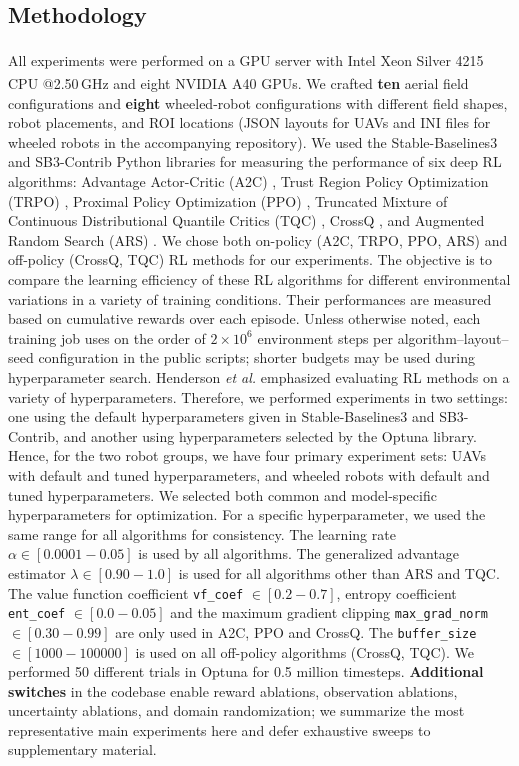 \documentclass{article}
\begin{document}
\subsection{Methodology}
All experiments were performed on a GPU server with  Intel\textsuperscript{\textregistered} Xeon\textsuperscript{\textregistered} Silver 4215 CPU @2.50\,GHz and eight NVIDIA\textsuperscript{\textregistered} A40 GPUs. We crafted \textbf{ten} aerial field configurations and \textbf{eight} wheeled-robot configurations with different field shapes, robot placements, and ROI locations (JSON layouts for UAVs and INI files for wheeled robots in the accompanying repository). We used the Stable-Baselines3 and SB3-Contrib \citep{stable-baselines3} Python libraries for measuring the performance of six deep RL algorithms: Advantage Actor-Critic (A2C) \citep{mnih2016a2c}, Trust Region Policy Optimization (TRPO) \citep{schulman2015trust}, Proximal Policy Optimization (PPO) \citep{schulman2017ppo}, Truncated Mixture of Continuous Distributional Quantile Critics (TQC) \citep{kuznetsov2020tqc}, CrossQ \citep{bhatt2024crossq}, and Augmented Random Search (ARS) \citep{mania2018ars}. We chose both on-policy (A2C, TRPO, PPO, ARS) and off-policy (CrossQ, TQC) RL methods for our experiments. The objective is to compare the learning efficiency of these RL algorithms for different environmental variations in a variety of training conditions. Their performances are measured based on cumulative rewards over each episode.
Unless otherwise noted, each training job uses on the order of $2 \times 10^6$ environment steps per algorithm--layout--seed configuration in the public scripts; shorter budgets may be used during hyperparameter search. Henderson \textit{et al.}\citep{henderson2018deep} emphasized evaluating RL methods on a variety of hyperparameters. Therefore, we performed experiments in two settings: one using the default hyperparameters given in Stable-Baselines3 and SB3-Contrib, and another using hyperparameters selected by the Optuna \citep{optuna_2019} library. Hence, for the two robot groups, we have four primary experiment sets: UAVs with default and tuned hyperparameters, and wheeled robots with default and tuned hyperparameters. We selected both common and model-specific hyperparameters for optimization. For a specific hyperparameter, we used the same range for all algorithms for consistency. The learning rate $\alpha \in [0.0001 - 0.05]$ is used by all algorithms. The generalized advantage estimator $\lambda \in [0.90 - 1.0]$ is used for all algorithms other than ARS and TQC. The value function coefficient \texttt{vf\_coef} $\in [0.2 - 0.7]$, entropy coefficient \texttt{ent\_coef} $\in [0.0 - 0.05]$ and the maximum gradient clipping \texttt{max\_grad\_norm} $\in [0.30 - 0.99]$ are only used in A2C, PPO and CrossQ. The \texttt{buffer\_size} $\in [1000-100000]$ is used on all off-policy algorithms (CrossQ, TQC). We performed 50 different trials in Optuna \citep{optuna_2019} for 0.5 million timesteps. \textbf{Additional switches} in the codebase enable reward ablations, observation ablations, uncertainty ablations, and domain randomization; we summarize the most representative main experiments here and defer exhaustive sweeps to supplementary material.
\end{document}
